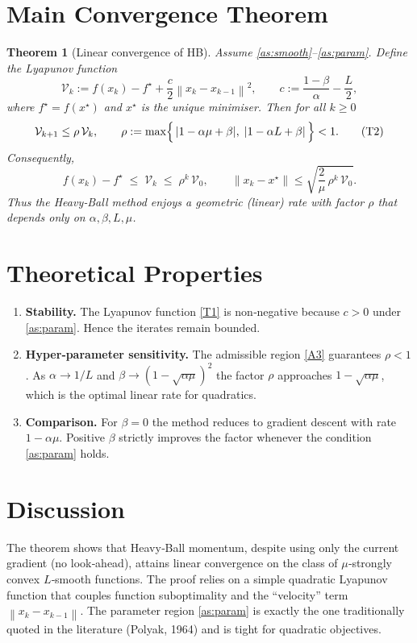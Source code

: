 \documentclass[11pt]{article}
\newtheorem{theorem}{Theorem}
\newcommand{\norm}[1]{\left\lVert#1\right\rVert}
\begin{document}
\section*{Main Convergence Theorem}
\begin{theorem}[Linear convergence of HB]\label{thm:linear}
Assume \ref{as:smooth}–\ref{as:param}.  Define the Lyapunov function
\[
\mathcal{V}_{k}:=f(x_{k})-f^{\star}
            +\frac{c}{2}\norm{x_{k}-x_{k-1}}^{2},
\qquad c:=\frac{1-\beta}{\alpha}-\frac{L}{2},
\tag{T1}
\]
where $f^{\star}=f(x^{\star})$ and $x^{\star}$ is the unique minimiser.  
Then for all $k\ge0$
\[
\mathcal{V}_{k+1}\le\rho\,\mathcal{V}_{k},
\qquad
\rho:=\max\Bigl\{\,|1-\alpha\mu+\beta|,\;|1-\alpha L+\beta|\,\Bigr\}<1.
\tag{T2}
\]
Consequently,
\[
f(x_{k})-f^{\star}\;\le\;\mathcal{V}_{k}
\;\le\;\rho^{k}\,\mathcal{V}_{0},
\qquad
\norm{x_{k}-x^{\star}}\le\sqrt{\frac{2}{\mu}\,\rho^{k}\,\mathcal{V}_{0}}.
\tag{T3}
\]
Thus the Heavy‑Ball method enjoys a geometric (linear) rate with factor $\rho$ that depends only on $\alpha,\beta,L,\mu$.
\end{theorem}

\section*{Theoretical Properties}
\begin{enumerate}[leftmargin=2cm]
\item \textbf{Stability.}  The Lyapunov function \eqref{T1} is non‑negative because $c>0$ under \ref{as:param}.  Hence the iterates remain bounded.
\item \textbf{Hyper‑parameter sensitivity.}  The admissible region \eqref{A3} guarantees $\rho<1$.  As $\alpha\to 1/L$ and $\beta\to (1-\sqrt{\alpha\mu})^{2}$ the factor $\rho$ approaches $1-\sqrt{\alpha\mu}$, which is the optimal linear rate for quadratics.
\item \textbf{Comparison.}  For $\beta=0$ the method reduces to gradient descent with rate $1-\alpha\mu$.  Positive $\beta$ strictly improves the factor whenever the condition \ref{as:param} holds.
\end{enumerate}

\section*{Discussion}
The theorem shows that Heavy‑Ball momentum, despite using only the current gradient (no look‑ahead), attains linear convergence on the class of $\mu$‑strongly convex $L$‑smooth functions.  The proof relies on a simple quadratic Lyapunov function that couples function suboptimality and the ``velocity'' term $\norm{x_{k}-x_{k-1}}$.  The parameter region \ref{as:param} is exactly the one traditionally quoted in the literature (Polyak, 1964) and is tight for quadratic objectives.
\end{document}
